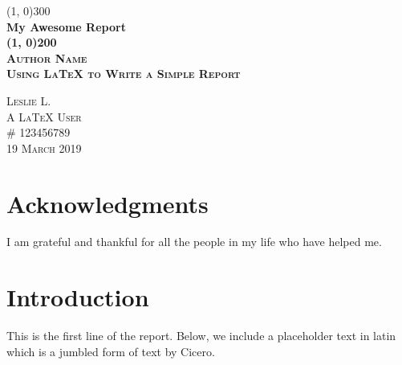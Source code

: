 \documentclass{article}
\begin{document}
\begin{titlepage}

\begin{center}
\line(1, 0){300}\\
[0.25in]
\huge\bfseries My Awesome Report\\
[2mm]
\line(1, 0){200}\\
[1.5cm]
\textsc{\LARGE Author Name}\\
[0.75cm]
\textsc{\Large Using LaTeX to Write a Simple Report}\\
[9cm]
\begin{flushright}
\textsc{\large Leslie L.\\
A LaTeX User\\
\# 123456789\\
19 March 2019\\}
\end{flushright}

\end{center}

\end{titlepage}

\section*{Acknowledgments}
I am grateful and thankful for all the people in my life who have helped me.

\cleardoublepage

\tableofcontents
\thispagestyle{empty}    %
\cleardoublepage
\setcounter{page}{1}    %

\listoffigures
{}
\cleardoublepage

\listoftables
{}
\cleardoublepage


\section{Introduction}\label{sec:intro}
This is the first line of the report.  Below, we include a placeholder text in latin which is
a jumbled form of text by Cicero.
\end{document}

